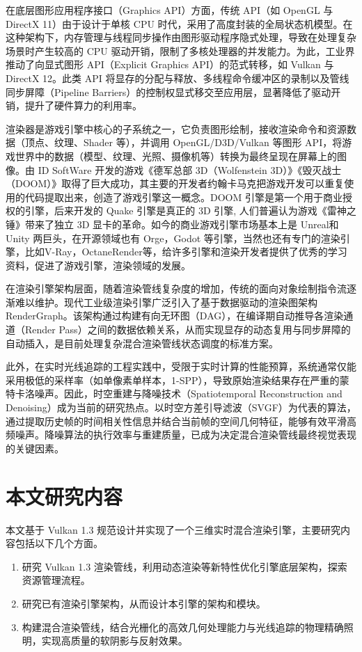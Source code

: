 在底层图形应用程序接口（Graphics API）方面，传统 API（如 OpenGL 与 DirectX 11）由于设计于单核 CPU 时代，采用了高度封装的全局状态机模型。在这种架构下，内存管理与线程同步操作由图形驱动程序隐式处理，导致在处理复杂场景时产生较高的 CPU 驱动开销，限制了多核处理器的并发能力。为此，工业界推动了向显式图形 API（Explicit Graphics API）的范式转移，如 Vulkan 与 DirectX 12。此类 API 将显存的分配与释放、多线程命令缓冲区的录制以及管线同步屏障（Pipeline Barriers）的控制权显式移交至应用层，显著降低了驱动开销，提升了硬件算力的利用率。

渲染器是游戏引擎中核心的子系统之一，它负责图形绘制，接收渲染命令和资源数据（顶点、纹理、Shader 等），并调用 OpenGL/D3D/Vulkan 等图形 API，将游戏世界中的数据（模型、纹理、光照、摄像机等）转换为最终呈现在屏幕上的图像。由 ID SoftWare 开发的游戏《德军总部 3D（Wolfenstein 3D）》《毁灭战士（DOOM）》取得了巨大成功，其主要的开发者约翰卡马克把游戏开发可以重复使用的代码提取出来，创造了游戏引擎这一概念。DOOM 引擎是第一个用于商业授权的引擎，后来开发的 Quake 引擎是真正的 3D 引擎, 人们普遍认为游戏《雷神之锤》带来了独立 3D 显卡的革命。如今的商业游戏引擎市场基本上是 Unreal和Unity 两巨头，在开源领域也有 Orge，Godot 等引擎，当然也还有专门的渲染引擎，比如V-Ray，OctaneRender等，给许多引擎和渲染开发者提供了优秀的学习资料，促进了游戏引擎，渲染领域的发展。

在渲染引擎架构层面，随着渲染管线复杂度的增加，传统的面向对象绘制指令流逐渐难以维护。现代工业级渲染引擎广泛引入了基于数据驱动的渲染图架构RenderGraph。该架构通过构建有向无环图（DAG），在编译期自动推导各渲染通道（Render Pass）之间的数据依赖关系，从而实现显存的动态复用与同步屏障的自动插入，是目前处理复杂混合渲染管线状态调度的标准方案。

此外，在实时光线追踪的工程实践中，受限于实时计算的性能预算，系统通常仅能采用极低的采样率（如单像素单样本，1-SPP），导致原始渲染结果存在严重的蒙特卡洛噪声。因此，时空重建与降噪技术（Spatiotemporal Reconstruction and Denoising）成为当前的研究热点。以时空方差引导滤波（SVGF）为代表的算法，通过提取历史帧的时间相关性信息并结合当前帧的空间几何特征，能够有效平滑高频噪声。降噪算法的执行效率与重建质量，已成为决定混合渲染管线最终视觉表现的关键因素。

\section{本文研究内容}
本文基于 Vulkan 1.3 规范设计并实现了一个三维实时混合渲染引擎，主要研究内容包括以下几个方面。
\begin{enumerate}
    \item 研究 Vulkan 1.3 渲染管线，利用动态渲染等新特性优化引擎底层架构，探索资源管理流程。
    \item 研究已有渲染引擎架构，从而设计本引擎的架构和模块。
    \item 构建混合渲染管线，结合光栅化的高效几何处理能力与光线追踪的物理精确照明，实现高质量的软阴影与反射效果。
\end{enumerate}

